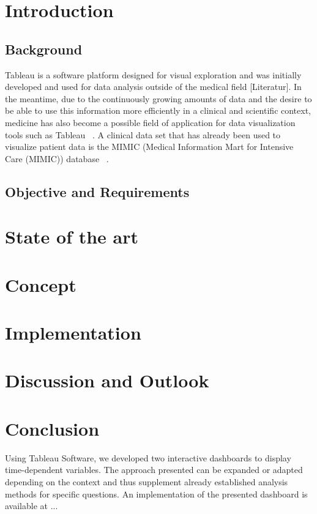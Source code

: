\documentclass[aac]{iosart2x}
\begin{document}

\section{Introduction}\label{s1}

\subsection{Background}\label{s1.1}
\noindent Tableau is a software platform designed for visual exploration and was initially developed and used for
data analysis outside of the medical field [Literatur]. In the meantime, due to the continuously growing
amounts of data and the desire to be able to use this information more efficiently in a clinical and
scientific context, medicine has also become a possible field of application for data visualization tools
such as Tableau ~\cite{Ko.2017}. A clinical data set that has already been used to visualize patient data is the MIMIC
(Medical Information Mart for Intensive Care (MIMIC)) database ~\cite{Festag.2019,Lee.2016}.



\subsection{Objective and Requirements}\label{s1.2}

\section{State of the art}\label{s2}


\section{Concept}\label{s3}


\section{Implementation}\label{s4}

\section{Discussion and Outlook}\label{s5}

\section{Conclusion}\label{s6}
Using Tableau Software, we developed two interactive dashboards to display time-dependent variables. The approach presented can be expanded or adapted depending on the context and thus supplement already established analysis methods for specific questions. An implementation of the presented dashboard is available at ...
\end{document}
